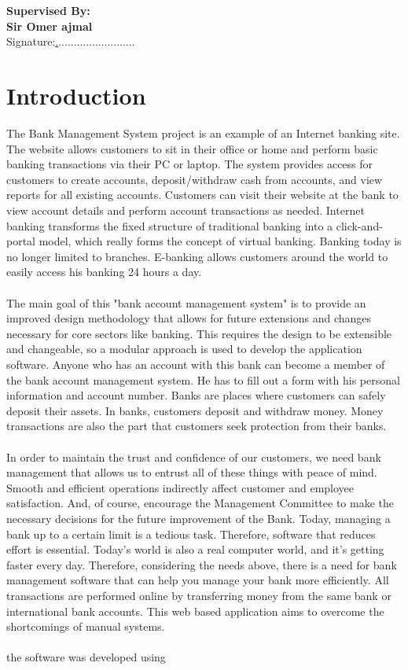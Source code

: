 \documentclass{article}
\begin{document}
\\ \hfill \break \hfill \break \hfill \break \hfill \break \hfill \break \hfill \break \hfill \break
\\
{\bfseries\Large Supervised By:}\\ \hfill \break
    {\bfseries\Large Sir Omer ajmal}\\ \hfill \break \hfill \break \hfill \break \hfill \break
    {Signature:\underline ..........................}
    
\newpage
\section{Introduction}
The Bank Management System project is an example of an Internet banking site. The website allows customers to sit in their office or home and perform basic banking transactions via their PC or laptop. The system provides access for customers to create accounts, deposit/withdraw cash from accounts, and view reports for all existing accounts. Customers can visit their website at the bank to view account details and perform account transactions as needed. Internet banking transforms the fixed structure of traditional banking into a click-and-portal model, which really forms the concept of virtual banking. Banking today is no longer limited to branches. E-banking allows customers around the world to easily access his banking 24 hours a day.\\\\ The main goal of this "bank account management system" is to provide an improved design methodology that allows for future extensions and changes necessary for core sectors like banking. This requires the design to be extensible and changeable, so a modular approach is used to develop the application software. Anyone who has an account with this bank can become a member of the bank account management system. He has to fill out a form with his personal information and account number. Banks are places where customers can safely deposit their assets. In banks, customers deposit and withdraw money. Money transactions are also the part that customers seek protection from their banks. \\\\In order to maintain the trust and confidence of our customers, we need bank management that allows us to entrust all of these things with peace of mind. Smooth and efficient operations indirectly affect customer and employee satisfaction. And, of course, encourage the Management Committee to make the necessary decisions for the future improvement of the Bank. Today, managing a bank up to a certain limit is a tedious task. Therefore, software that reduces effort is essential. Today's world is also a real computer world, and it's getting faster every day. Therefore, considering the needs above, there is a need for bank management software that can help you manage your bank more efficiently. All transactions are performed online by transferring money from the same bank or international bank accounts. This web based application aims to overcome the shortcomings of manual systems.\\\\the software was developed using 
\end{document}
